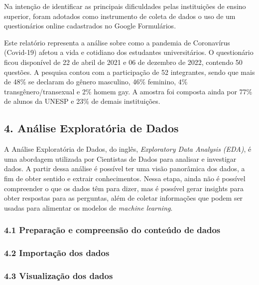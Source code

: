 \documentclass[
]{article}
\begin{document}
Na intenção de identificar as principais dificuldades pelas instituições
de ensino superior, foram adotados como instrumento de coleta de dados o
uso de um questionários online cadastrados no Google Formulários.

Este relatório representa a análise sobre como a pandemia de Coronavírus
(Covid-19) afetou a vida e cotidiano dos estudantes universitários. O
questionário ficou disponível de 22 de abril de 2021 e 06 de dezembro de
2022, contendo 50 questões. A pesquisa contou com a participação de 52
integrantes, sendo que mais de 48\% se declaram do gênero masculino,
46\% feminino, 4\% transgênero/transexual e 2\% homem gay. A amostra foi
composta ainda por 77\% de alunos da UNESP e 23\% de demais
instituições.

\hypertarget{anuxe1lise-exploratuxf3ria-de-dados}{%
\subsection{4. Análise Exploratória de
Dados}\label{anuxe1lise-exploratuxf3ria-de-dados}}

A Análise Exploratória de Dados, do inglês, \emph{Exploratory Data
Analysis (EDA)}, é uma abordagem utilizada por Cientistas de Dados para
analisar e investigar dados. A partir dessa análise é possível ter uma
visão panorâmica dos dados, a fim de obter sentido e extrair
conhecimentos. Nessa etapa, ainda não é possível compreender o que os
dados têm para dizer, mas é possível gerar insights para obter respostas
para as perguntas, além de coletar informações que podem ser usadas para
alimentar os modelos de \emph{machine learning}.

\hypertarget{preparauxe7uxe3o-e-compreensuxe3o-do-conteuxfado-de-dados}{%
\subsubsection{4.1 Preparação e compreensão do conteúdo de
dados}\label{preparauxe7uxe3o-e-compreensuxe3o-do-conteuxfado-de-dados}}

\hypertarget{importauxe7uxe3o-dos-dados}{%
\subsubsection{4.2 Importação dos
dados}\label{importauxe7uxe3o-dos-dados}}

\hypertarget{visualizauxe7uxe3o-dos-dados}{%
\subsubsection{4.3 Visualização dos
dados}\label{visualizauxe7uxe3o-dos-dados}}
\end{document}
